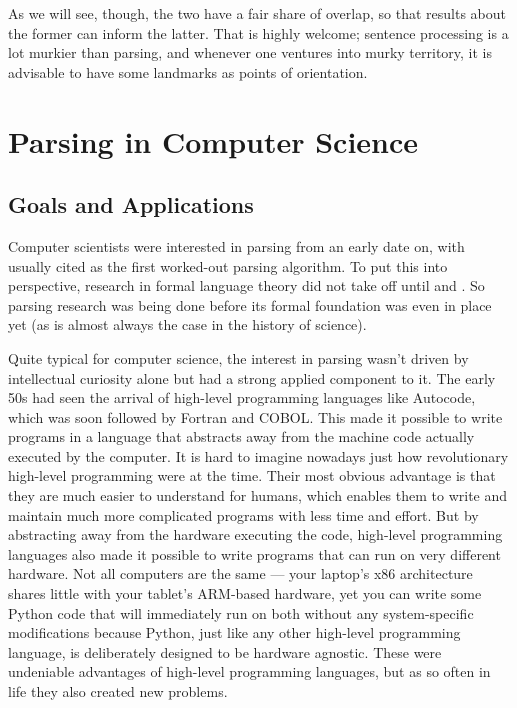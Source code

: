 As we will see, though, the two have a fair share of overlap, so that results about the former can inform the latter.
That is highly welcome; sentence processing is a lot murkier than parsing, and whenever one ventures into murky territory, it is advisable to have some landmarks as points of orientation.

\section{Parsing in Computer Science}
\label{sec:BigPicture_CS}

\subsection{Goals and Applications}
\label{sec:BigPicture_CS-Goals}

Computer scientists were interested in parsing from an early date on, with \citet{Yngve55} usually cited as the first worked-out parsing algorithm.
To put this into perspective, research in formal language theory did not take off until \cite{Chomsky56} and \citet{ChomskySchuetzenberger63}.
So parsing research was being done before its formal foundation was even in place yet (as is almost always the case in the history of science).

Quite typical for computer science, the interest in parsing wasn't driven by intellectual curiosity alone but had a strong applied component to it.
The early 50s had seen the arrival of high-level programming languages like Autocode, which was soon followed by Fortran and COBOL\@. 
This made it possible to write programs in a language that abstracts away from the machine code actually executed by the computer.
It is hard to imagine nowadays just how revolutionary high-level programming were at the time.
Their most obvious advantage is that they are much easier to understand for humans, which enables them to write and maintain much more complicated programs with less time and effort. 
But by abstracting away from the hardware executing the code, high-level programming languages also made it possible to write programs that can run on very different hardware.
Not all computers are the same --- your laptop's x86 architecture shares little with your tablet's ARM-based hardware, yet you can write some Python code that will immediately run on both without any system-specific modifications because Python, just like any other high-level programming language, is deliberately designed to be hardware agnostic.
These were undeniable advantages of high-level programming languages, but as so often in life they also created new problems.

